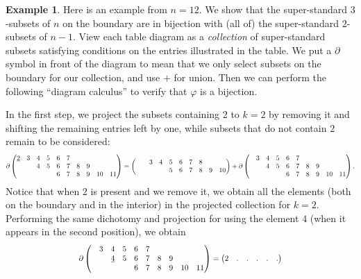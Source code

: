 \documentclass[11pt]{article}
\theoremstyle{definition}
\newtheorem{example}[theo]{Example}
\numberwithin{equation}{section}
\numberwithin{equation}{section}
\newcommand{\ul}[1]{\underline{#1}}
\newcommand\scalemath[2]{\scalebox{#1}{\mbox{\ensuremath{\displaystyle #2}}}}
\begin{document}
\begin{example}\label{e:phi}
Here is an example from $n = 12$.  We show that the super-standard $3$-subsets of $n$ on the boundary are in bijection with (all of) the super-standard $2$-subsets of $n-1$.  View each table diagram as a {\em collection} of super-standard subsets satisfying conditions on the entries illustrated in the table.  We put a $\partial$ symbol in front of the diagram to mean that we only select subsets on the boundary for our collection, and use $+$ for union.  Then we can perform the following ``diagram calculus'' to verify that $\varphi$ is a bijection.

In the first step, we project the subsets containing $2$ to $k = 2$ by removing it and shifting the remaining entries left by one, while subsets that do not contain $2$ remain to be considered:
\[ \scalemath{0.8}{
\partial 
\begin{pmatrix}
    {\ul 2} & 3 & 4 & 5 & 6 & 7  \\
    &   & 4 & 5 & 6 & 7 & 8 & 9 \\
    &   &   &   & 6 & 7 & 8 & 9 & 10 & 11 \\
\end{pmatrix}
= \begin{pmatrix}
    &   & 3 & 4 & 5 & 6 & 7 & 8 \\
    &   &   &   & 5 & 6 & 7 & 8 & 9 & 10 \\
\end{pmatrix}
+
\partial \begin{pmatrix}
       & 3 & 4 & 5 & 6 & 7  \\
        &   & 4 & 5 & 6 & 7 & 8 & 9 \\
        &   &   &   & 6 & 7 & 8 & 9 & 10 & 11 \\
\end{pmatrix}.
} \]
Notice that when $2$ is present and we remove it, we obtain all the elements (both on the boundary and in the interior) in the projected collection for $k=2$.
Performing the same dichotomy and projection for using the element $4$ (when it appears in the second position), we obtain
\[ \scalemath{0.8}{
\partial \begin{pmatrix}
       & 3 & 4 & 5 & 6 & 7  \\
     &   & {\ul 4} & 5 & 6 & 7 & 8 & 9 \\
        &   &   &   & 6 & 7 & 8 & 9 & 10 & 11 \\
\end{pmatrix}
= 
\begin{pmatrix}
    2 & . & . & . & . & .  \\

\end{pmatrix}}\]
\end{example}
\end{document}
